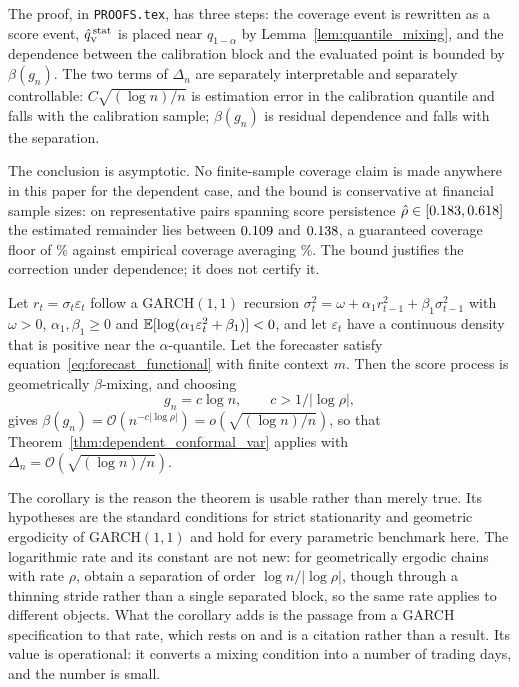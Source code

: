 The proof, in \texttt{PROOFS.tex}, has three steps: the coverage event is rewritten
as a score event, $\hat{q}_{\scriptscriptstyle\mathrm{V}}^{\,\mathrm{stat}}$ is placed near $q_{1-\alpha}$ by
Lemma~\ref{lem:quantile_mixing}, and the dependence between the calibration block
and the evaluated point is bounded by $\beta(g_n)$. The two terms of $\Delta_n$
are separately interpretable and separately controllable: $C\sqrt{(\log n)/n}$ is
estimation error in the calibration quantile and falls with the calibration
sample; $\beta(g_n)$ is residual dependence and falls with the separation.

The conclusion is asymptotic. No finite-sample coverage claim is made anywhere in
this paper for the dependent case, and the bound is conservative at financial
sample sizes: on \nBoundPairs{} representative pairs spanning score persistence
$\hat\rho\in[0.183,0.618]$ the estimated remainder lies between
$0.109$ and $0.138$, a guaranteed coverage floor of
\nBoundFloor\% against empirical coverage averaging \nBoundEmpirical\%. The bound justifies the
correction under dependence; it does not certify it.

\begin{corollary}
	\label{cor:garch}
	Let $r_t = \sigma_t\varepsilon_t$ follow a GARCH$(1,1)$ recursion
	$\sigma_t^2 = \omega + \alpha_1 r_{t-1}^2 + \beta_1\sigma_{t-1}^2$ with
	$\omega>0$, $\alpha_1,\beta_1\ge 0$ and
	$\mathbb{E}[\log(\alpha_1\varepsilon_t^2+\beta_1)]<0$, and let $\varepsilon_t$ have a
	continuous density that is positive near the $\alpha$-quantile. Let the
	forecaster satisfy equation~\eqref{eq:forecast_functional} with finite
	context $m$. Then the score process is geometrically $\beta$-mixing, and
	choosing
	\begin{equation}
		\label{eq:garch_gap_rate}
		g_n = c\log n,
		\qquad
		c > 1/\lvert\log\rho\rvert,
	\end{equation}
	gives $\beta(g_n) = \mathcal O(n^{-c\lvert\log\rho\rvert}) = o\!\left(\sqrt{(\log n)/n}\right)$,
	so that Theorem~\ref{thm:dependent_conformal_var} applies with
	$\Delta_n = \mathcal O\!\left(\sqrt{(\log n)/n}\right)$.
\end{corollary}

The corollary is the reason the theorem is usable rather than merely true. Its
hypotheses are the standard conditions for strict stationarity and geometric
ergodicity of GARCH$(1,1)$
\citep[Theorem~2.10]{francq2019garch,lindner2009stationarity} and hold for every
parametric benchmark here. The logarithmic rate and its constant are not new:
for geometrically ergodic chains with rate $\rho$,
\citet[Theorem~5.1]{zheng2024conformal} obtain a separation of order
$\log n/\lvert\log\rho\rvert$, though through a thinning stride rather than a
single separated block, so the same rate applies to different objects. What the
corollary adds is the passage from a GARCH specification to that rate, which
rests on \citet{carrasco2002mixing} and is a citation rather than a result. Its
value is operational: it converts a mixing condition into a number of trading
days, and the number is small.

